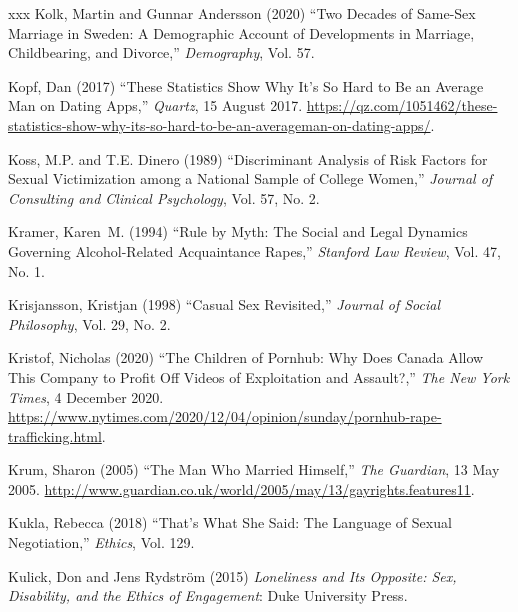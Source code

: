 \documentclass[]{jlreq} \usepackage{mystyle}
\begin{document}
\begin{thebibliography}{xxx}
Kolk, Martin and Gunnar Andersson (2020) ``Two Decades of Same-Sex Marriage in
  Sweden: A Demographic Account of Developments in Marriage, Childbearing, and
  Divorce,'' \textit{ Demography}, Vol. 57.

Kopf, Dan (2017) ``These Statistics Show Why It's So Hard to Be an Average Man
  on Dating Apps,'' \emph{Quartz}, 15 August 2017.
  \url{https://qz.com/1051462/these-statistics-show-why-its-so-hard-to-be-an-averageman-on-dating-apps/}.

Koss, M.P. and T.E. Dinero (1989) ``Discriminant Analysis of Risk Factors for
  Sexual Victimization among a National Sample of College Women,'' \textit{
  Journal of Consulting and Clinical Psychology}, Vol. 57, No. 2.

Kramer, Karen~M. (1994) ``Rule by Myth: The Social and Legal Dynamics Governing
  Alcohol-Related Acquaintance Rapes,'' \textit{ Stanford Law Review}, Vol. 47,
  No. 1.

Krisjansson, Kristjan (1998) ``Casual Sex Revisited,'' \textit{ Journal of
  Social Philosophy}, Vol. 29, No. 2.

Kristof, Nicholas (2020) ``The Children of Pornhub: Why Does Canada Allow This
  Company to Profit Off Videos of Exploitation and Assault?,'' \emph{The New
  York Times}, 4 December 2020.
  \url{https://www.nytimes.com/2020/12/04/opinion/sunday/pornhub-rape-trafficking.html}.

Krum, Sharon (2005) ``The Man Who Married Himself,'' \emph{The Guardian}, 13
  May 2005.
  \url{http://www.guardian.co.uk/world/2005/may/13/gayrights.features11}.

Kukla, Rebecca (2018) ``That's What She Said: The Language of Sexual
  Negotiation,'' \textit{ Ethics}, Vol. 129.

Kulick, Don and Jens Rydström (2015)  \textit{ Loneliness and Its Opposite:
  Sex, Disability, and the Ethics of Engagement}: Duke University Press.


\end{thebibliography}
\end{document}
